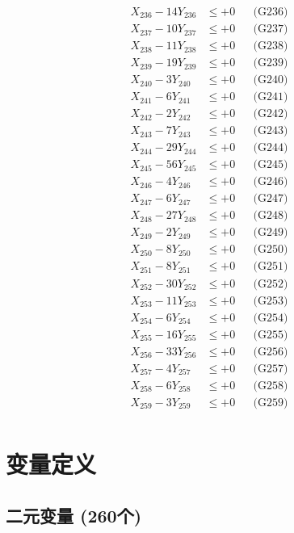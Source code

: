 \documentclass[a4paper,10pt]{article}
\begin{document}
{\begin{align}
X_{236} - 14Y_{236} &\leq +0 && \text{(G236)} \\
X_{237} - 10Y_{237} &\leq +0 && \text{(G237)} \\
X_{238} - 11Y_{238} &\leq +0 && \text{(G238)} \\
X_{239} - 19Y_{239} &\leq +0 && \text{(G239)} \\
X_{240} - 3Y_{240} &\leq +0 && \text{(G240)} \\
X_{241} - 6Y_{241} &\leq +0 && \text{(G241)} \\
X_{242} - 2Y_{242} &\leq +0 && \text{(G242)} \\
X_{243} - 7Y_{243} &\leq +0 && \text{(G243)} \\
\allowbreak
X_{244} - 29Y_{244} &\leq +0 && \text{(G244)} \\
X_{245} - 56Y_{245} &\leq +0 && \text{(G245)} \\
X_{246} - 4Y_{246} &\leq +0 && \text{(G246)} \\
X_{247} - 6Y_{247} &\leq +0 && \text{(G247)} \\
X_{248} - 27Y_{248} &\leq +0 && \text{(G248)} \\
X_{249} - 2Y_{249} &\leq +0 && \text{(G249)} \\
X_{250} - 8Y_{250} &\leq +0 && \text{(G250)} \\
X_{251} - 8Y_{251} &\leq +0 && \text{(G251)} \\
X_{252} - 30Y_{252} &\leq +0 && \text{(G252)} \\
X_{253} - 11Y_{253} &\leq +0 && \text{(G253)} \\
\allowbreak
X_{254} - 6Y_{254} &\leq +0 && \text{(G254)} \\
X_{255} - 16Y_{255} &\leq +0 && \text{(G255)} \\
X_{256} - 33Y_{256} &\leq +0 && \text{(G256)} \\
X_{257} - 4Y_{257} &\leq +0 && \text{(G257)} \\
X_{258} - 6Y_{258} &\leq +0 && \text{(G258)} \\
X_{259} - 3Y_{259} &\leq +0 && \text{(G259)} \\
\end{align}
}

\section{变量定义}

\subsection{二元变量 (260个)}
\end{document}
